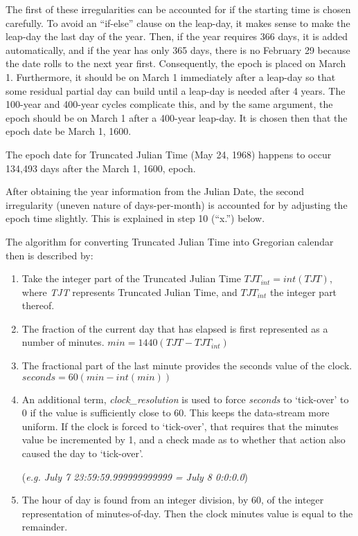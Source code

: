 {\begin{enumerate}
{\begin{enumerate}
The first of these irregularities can be accounted for if the starting
time is chosen carefully.  To avoid an
{\textquotedblleft}if-else{\textquotedblright} clause on the leap-day,
it makes sense to make the leap-day the last day of the year.  Then, if
the year requires 366 days, it is added automatically, and if the year
has only 365 days, there is no February 29 because the date rolls to
the next year first.  Consequently, the epoch is placed on March 1.
Furthermore, it should be on March 1 immediately after a leap-day so
that some residual partial day can build until a leap-day is needed
after 4 years.  The 100-year and 400-year cycles complicate this, and
by the same argument, the epoch should be on March 1 after a 400-year
leap-day.  It is chosen then that the epoch date be March 1, 1600.

The epoch date for Truncated Julian Time (May 24, 1968) happens to occur
134,493 days after the March 1, 1600, epoch.

After obtaining the year information from the Julian Date, the second
irregularity (uneven nature of days-per-month) is accounted for by
adjusting the epoch time slightly.  This is explained in step 10 (``x.'')
below.

The algorithm for converting Truncated Julian Time into Gregorian
calendar then is described by:

\begin{enumerate}
\item Take the integer part of the Truncated Julian Time
$TJT_{int}=int(TJT)$, where \textit{TJT } represents Truncated Julian Time, and
$TJT_{int}$ the integer part thereof.
\item The fraction of the current day that has elapsed is first
represented as a number of minutes.
${min}=1440\left({TJT}-{TJT}_{int}\right)$
\item The fractional part of the last minute provides the seconds value
of the clock.
${seconds}=60\left({min}-int(min)\right)$
\item An additional term, \textit{clock\_resolution }is used to force
\textit{seconds } to `tick-over' to 0
if the value is sufficiently close to 60.  This keeps the data-stream
more uniform.  If the clock is forced to
`tick-over', that requires that the
minutes value be incremented by 1, and a check made as to whether that
action also caused the day to
`tick-over'.

(\textit{e.g. July 7 23:59:59.999999999999 = July 8 0:0:0.0})
\item The hour of day is found from an integer division, by 60, of the
integer representation of minutes-of-day.  Then the clock minutes value
is equal to the remainder.


\end{enumerate}
\end{enumerate}}
\end{enumerate}}
